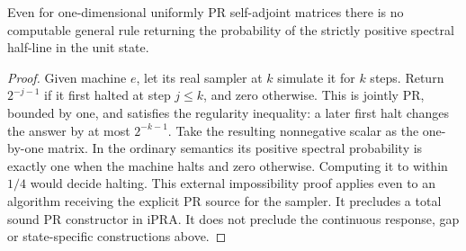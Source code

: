 \begin{proposition}\label{prop:cut}
Even for one-dimensional uniformly PR self-adjoint matrices there is no computable general rule returning the probability of the strictly positive spectral half-line in the unit state.
\end{proposition}
\begin{proof}
Given machine $e$, let its real sampler at $k$ simulate it for $k$ steps. Return $2^{-j-1}$ if it first halted at step $j\le k$, and zero otherwise. This is jointly PR, bounded by one, and satisfies the regularity inequality: a later first halt changes the answer by at most $2^{-k-1}$. Take the resulting nonnegative scalar as the one-by-one matrix. In the ordinary semantics its positive spectral probability is exactly one when the machine halts and zero otherwise. Computing it to within $1/4$ would decide halting. This external impossibility proof applies even to an algorithm receiving the explicit PR source for the sampler. It precludes a total sound PR constructor in iPRA. It does not preclude the continuous response, gap or state-specific constructions above.
\end{proof}
